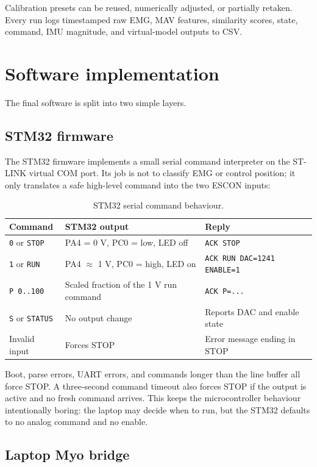 \documentclass[11pt,a4paper]{report}
\begin{document}
Calibration presets can be reused, numerically adjusted, or partially retaken. Every run logs timestamped raw EMG, MAV features, similarity scores, state, command, IMU magnitude, and virtual-model outputs to CSV.

\section{Software implementation}

The final software is split into two simple layers.

\subsection{STM32 firmware}

The STM32 firmware implements a small serial command interpreter on the ST-LINK virtual COM port. Its job is not to classify EMG or control position; it only translates a safe high-level command into the two ESCON inputs:

\begin{table}[H]
\centering
\caption{STM32 serial command behaviour.}
\begin{tabular}{lll}
\toprule
Command & STM32 output & Reply\\
\midrule
\texttt{0} or \texttt{STOP} & PA4 = 0 V, PC0 = low, LED off & \texttt{ACK STOP}\\
\texttt{1} or \texttt{RUN} & PA4 $\approx$ 1 V, PC0 = high, LED on & \texttt{ACK RUN DAC=1241 ENABLE=1}\\
\texttt{P 0..100} & Scaled fraction of the 1 V run command & \texttt{ACK P=...}\\
\texttt{S} or \texttt{STATUS} & No output change & Reports DAC and enable state\\
Invalid input & Forces STOP & Error message ending in STOP\\
\bottomrule
\end{tabular}
\end{table}

Boot, parse errors, UART errors, and commands longer than the line buffer all force STOP. A three-second command timeout also forces STOP if the output is active and no fresh command arrives. This keeps the microcontroller behaviour intentionally boring: the laptop may decide when to run, but the STM32 defaults to no analog command and no enable.

\subsection{Laptop Myo bridge}
\end{document}
